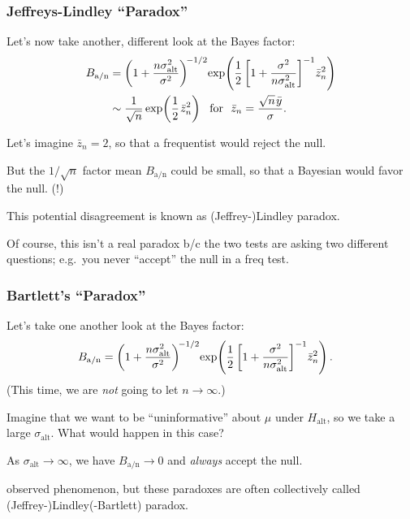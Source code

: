 \documentclass[18pt]{beamer}
\newcommand{\defineTightSpacing}{%
	\setlength{\abovedisplayskip}{.25\baselineskip}%
	\setlength{\belowdisplayskip}{.25\baselineskip}%
}
\newcommand{\thinnerspace}{\mskip.5\thinmuskip}
\newcommand{\hypothesis}{H}
\newcommand{\altSub}{\mathrm{alt}}
\newcommand{\bayesFacAlt}{B_{\mathrm{a} / \mathrm{n}}}
\begin{document}
\begin{frame}
\frametitle{Jeffreys-Lindley ``Paradox''}
Let's now take another, different look at the Bayes factor: 
\begin{equation*} \defineTightSpacing%
\begin{aligned}
\bayesFacAlt
	&= \left( 1 + \frac{n \sigma_\altSub^2}{\sigma^2} \right)^{\!-1/2} \!
	\exp\!\left(
		\frac{1}{2} 
		\left[ 1 + \frac{\sigma^2}{n \sigma_\altSub^2} \right]^{-1} \!
		\bar{z}_n^2
	\right) \\
	&\sim \frac{1}{\sqrt{n}} 
		\exp\!\left(
			\frac{1}{2} \thinnerspace \bar{z}_n^2
		\right)
	\ \text{ for } \
	\bar{z}_n = \frac{\sqrt{n} \thinnerspace \bar{y}}{\sigma}.
\end{aligned}
\end{equation*}

\pause
\smallskip
Let's imagine $\bar{z}_n = 2$, so that a frequentist would reject the null.

\pause
\smallskip
But the $1 / \sqrt{n}$ factor mean $\bayesFacAlt$ could be small, so that a Bayesian would favor the null. (!)

\pause
\smallskip
This potential disagreement is known as (Jeffrey-)Lindley paradox.

\pause
Of course, this isn't a real paradox b/c the two tests are asking two different questions; 
e.g.\ you never ``accept'' the null in a freq test.
\end{frame}


\begin{frame}
\frametitle{Bartlett's ``Paradox''}
Let's take one another look at the Bayes factor: 
\begin{equation*} \defineTightSpacing%
\begin{aligned}
\bayesFacAlt
	&= \left( 1 + \frac{n \sigma_\altSub^2}{\sigma^2} \right)^{\!-1/2} \!
	\exp\!\left(
		\frac{1}{2} 
		\left[ 1 + \frac{\sigma^2}{n \sigma_\altSub^2} \right]^{-1} \!
		\bar{z}_n^2
	\right).
\end{aligned}
\end{equation*}
(This time, we are \textit{not} going to let $n \to \infty$.)

\pause
\smallskip
Imagine that we want to be ``uninformative'' about $\mu$ under $\hypothesis_\altSub$, so we take a large $\sigma_\altSub$.
What would happen in this case?

\pause
\smallskip
As $\sigma_\altSub \to \infty$, we have $\bayesFacAlt \to 0$ and \textit{always} accept the null.

\pause
\smallskip
\cite{bartlett1957paradox} observed phenomenon, but these paradoxes are often collectively called (Jeffrey-)Lindley(-Bartlett) paradox.
\end{frame}
\end{document}
